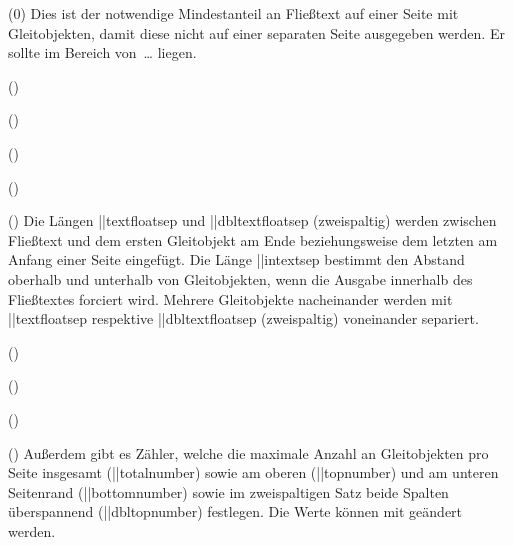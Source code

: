 \begin{Entity}{}
\begin{Declaration}
  {}
  (0\textfraction)
\printdeclarationlist
%
Dies ist der notwendige Mindestanteil an Fließtext auf einer Seite mit 
Gleitobjekten, damit diese nicht auf einer separaten Seite ausgegeben werden. 
Er sollte im Bereich von~\dots{} liegen.
\end{Declaration}

\begin{Declaration}
  {}
  (\the\textfloatsep)
\begin{Declaration}
  {}
  (\the\dbltextfloatsep)
\begin{Declaration}
  {}
  (\the\intextsep)
\begin{Declaration}
  {}
  (\the\floatsep)
\begin{Declaration}
  {}
  (\the\dblfloatsep)
Die Längen \Length||{textfloatsep} und \Length||{dbltextfloatsep} (zweispaltig) 
werden zwischen Fließtext und dem ersten Gleitobjekt am Ende beziehungsweise 
dem letzten am Anfang einer Seite eingefügt. Die Länge \Length||{intextsep} 
bestimmt den Abstand oberhalb und unterhalb von Gleitobjekten, wenn die Ausgabe 
innerhalb des Fließtextes forciert wird. Mehrere Gleitobjekte nacheinander 
werden mit \Length||{textfloatsep} respektive \Length||{dbltextfloatsep} 
(zweispaltig) voneinander separiert.
\end{Declaration}
\end{Declaration}
\end{Declaration}
\end{Declaration}
\end{Declaration}

\begin{Declaration}
  {}
  ()
\begin{Declaration}
  {}
  ()
\begin{Declaration}
  {}
  ()
\begin{Declaration}
  {}
  ()
%
Außerdem gibt es Zähler, welche die maximale Anzahl an Gleitobjekten pro Seite 
insgesamt (\Counter||{totalnumber}) sowie am oberen (\Counter||{topnumber}) 
und am unteren Seitenrand (\Counter||{bottomnumber}) sowie im zweispaltigen 
Satz beide Spalten überspannend (\Counter||{dbltopnumber}) festlegen. Die Werte 
können mit  geändert werden.
\end{Declaration}
\end{Declaration}
\end{Declaration}
\end{Declaration}


\end{Entity}
